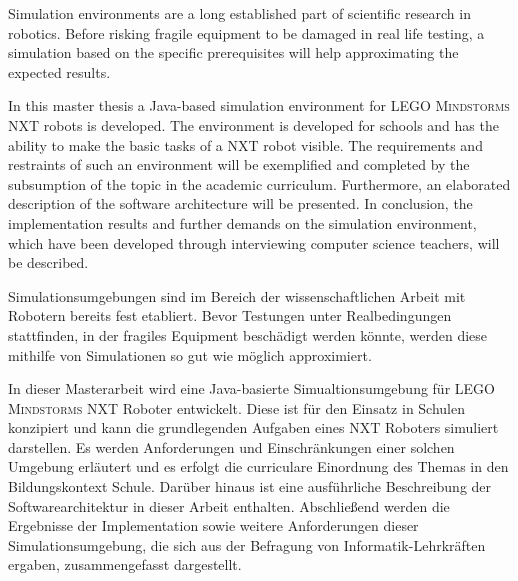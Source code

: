 \documentclass[paper=a4, DIV=calc, BCOR=12mm, twoside=on, onecolumn=on, open = right, titlepage =on, parskip =half-, headsepline = on, footsepline = off, chapterprefix = off, appendixprefix = on, fontsize = 12pt, numbers = noenddot, abstract = on]{scrbook}
\begin{document}
\newpage
\thispagestyle{plain}




\thispagestyle{empty}
\newpage
\thispagestyle{empty}

\onehalfspacing
Simulation environments are a long established part of scientific research in robotics. Before risking fragile equipment to be damaged in real life testing, a simulation based on the specific prerequisites will help approximating the expected results.

In this master thesis a Java-based simulation environment for \textsc{LEGO Mindstorms} NXT robots is developed. The environment is developed for schools and has the ability to make the basic tasks of a NXT robot visible. The requirements and restraints of such an environment will be exemplified and completed by the subsumption of the topic in the academic curriculum. Furthermore, an elaborated description of the software architecture will be presented. In conclusion, the implementation results and further demands on the simulation environment, which have been developed through interviewing computer science teachers, will be described.

\onehalfspacing
Simulationsumgebungen sind im Bereich der wissenschaftlichen Arbeit mit Robotern bereits fest etabliert. Bevor Testungen unter Realbedingungen stattfinden, in der fragiles Equipment beschädigt werden könnte, werden diese mithilfe von Simulationen so gut wie möglich approximiert.

In dieser Masterarbeit wird eine Java-basierte Simualtionsumgebung für \textsc{LEGO Mindstorms} NXT Roboter entwickelt. Diese ist für den Einsatz in Schulen konzipiert und kann die grundlegenden Aufgaben eines NXT Roboters simuliert darstellen. Es werden Anforderungen und Einschränkungen einer solchen Umgebung erläutert und es erfolgt die curriculare Einordnung des Themas in den Bildungskontext Schule. Darüber hinaus ist eine ausführliche Beschreibung der Softwarearchitektur in dieser Arbeit enthalten. Abschließend werden die Ergebnisse der Implementation sowie weitere Anforderungen dieser Simulationsumgebung, die sich aus der Befragung von Informatik-Lehrkräften ergaben, zusammengefasst dargestellt.

\singlespacing
\newpage
\listoffigures
\newpage
\tableofcontents
\thispagestyle{empty}
\cleardoublepage
\newpage
{}
\par \singlespacing
\end{document}
